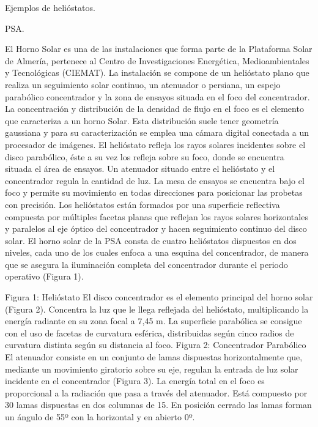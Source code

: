 \documentclass[12pt]{article}
\begin{document}
Ejemplos de helióstatos.

PSA.

El Horno Solar es una de las instalaciones que forma parte de la Plataforma Solar de Almería, pertenece al Centro de Investigaciones Energética, Medioambientales y Tecnológicas (CIEMAT). La instalación se compone de un helióstato plano que realiza un seguimiento solar continuo, un atenuador o persiana, un espejo parabólico concentrador y la zona de ensayos situada en el foco del concentrador.
            	La concentración y distribución de la densidad de flujo en el foco es el elemento que caracteriza a un horno Solar. Esta distribución suele tener geometría gaussiana y para su caracterización se emplea una cámara digital conectada a un procesador de imágenes.
            	El helióstato refleja los rayos solares incidentes sobre el disco parabólico, éste a su vez los refleja sobre su foco, donde se encuentra situada el área de ensayos. Un atenuador situado entre el helióstato y el concentrador regula la cantidad de luz. La mesa de ensayos se encuentra bajo el foco y permite su movimiento en todas direcciones para posicionar las probetas con precisión.
            	Los helióstatos están formados por una superficie reflectiva compuesta por múltiples facetas planas que reflejan los rayos solares horizontales y paralelos al eje óptico del concentrador y hacen seguimiento continuo del disco solar. El horno solar de la PSA consta de cuatro helióstatos dispuestos en dos niveles, cada uno de los cuales enfoca a una esquina del concentrador, de manera que se asegura la iluminación completa del concentrador durante el periodo operativo (Figura 1).

Figura 1: Helióstato
            	El disco concentrador es el elemento principal del horno solar (Figura 2). Concentra la luz que le llega reflejada del helióstato, multiplicando la energía radiante en su zona focal a 7,45 m. La superficie parabólica se consigue con el uso de facetas de curvatura esférica, distribuidas según cinco radios de curvatura distinta según su distancia al foco.
Figura 2: Concentrador Parabólico
                           	El atenuador consiste en un conjunto de lamas dispuestas horizontalmente que, mediante un movimiento giratorio sobre su eje, regulan la entrada de luz solar incidente en el concentrador (Figura 3).
            	La energía total en el foco es proporcional a la radiación que pasa a través del atenuador. Está compuesto por 30 lamas dispuestas en dos columnas de 15. En posición cerrado las lamas forman un ángulo de 55º con la horizontal y en abierto 0º.
\end{document}
